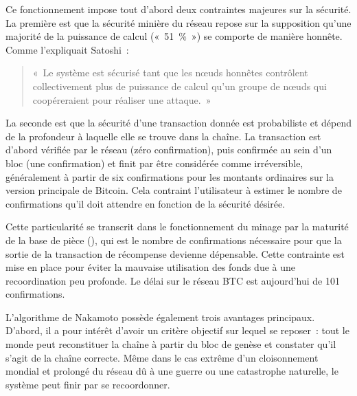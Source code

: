 

Ce fonctionnement impose tout d'abord deux contraintes majeures sur la sécurité. La première est que la sécurité minière du réseau repose sur la supposition qu'une majorité de la puissance de calcul («~51~\%~») se comporte de manière honnête. Comme l'expliquait Satoshi~:

\begin{quote}
«~Le système est sécurisé tant que les nœuds honnêtes contrôlent collectivement plus de puissance de calcul qu'un groupe de nœuds qui coopéreraient pour réaliser une attaque.~»
\end{quote}

La seconde est que la sécurité d'une transaction donnée est probabiliste et dépend de la profondeur à laquelle elle se trouve dans la chaîne. La transaction est d'abord vérifiée par le réseau (zéro confirmation), puis confirmée au sein d'un bloc (une confirmation) et finit par être considérée comme irréversible, généralement à partir de six confirmations pour les montants ordinaires sur la version principale de Bitcoin. Cela contraint l'utilisateur à estimer le nombre de confirmations qu'il doit attendre en fonction de la sécurité désirée.

Cette particularité se transcrit dans le fonctionnement du minage par la maturité de la base de pièce (), qui est le nombre de confirmations nécessaire pour que la sortie de la transaction de récompense devienne dépensable. Cette contrainte est mise en place pour éviter la mauvaise utilisation des fonds due à une recoordination peu profonde. Le délai sur le réseau BTC est aujourd'hui de 101 confirmations.


L'algorithme de Nakamoto possède également trois avantages principaux. D'abord, il a pour intérêt d'avoir un critère objectif sur lequel se reposer~: tout le monde peut reconstituer la chaîne à partir du bloc de genèse et constater qu'il s'agit de la chaîne correcte. Même dans le cas extrême d'un cloisonnement mondial et prolongé du réseau dû à une guerre ou une catastrophe naturelle, le système peut finir par se recoordonner.


